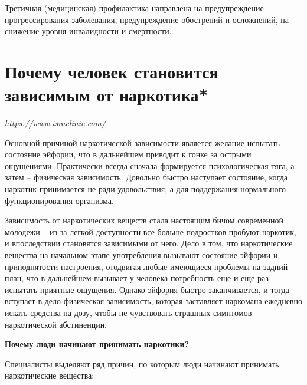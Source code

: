 Третичная (медицинская) профилактика направлена на предупреждение прогрессирования заболевания, предупреждение обострений и осложнений, на снижение уровня инвалидности и смертности.

\newpage
\section{Почему человек становится зависимым от наркотика*}

 {\it \url{https://www.israclinic.com/}}

\begin{fancyquotes}
    Основной причиной наркотической зависимости является желание испытать состояние эйфории, что в дальнейшем приводит к гонке за острыми ощущениями. Практически всегда сначала формируется психологическая тяга, а затем – физическая зависимость. Довольно быстро наступает состояние, когда наркотик принимается не ради удовольствия, а для поддержания нормального функционирования организма.
\end{fancyquotes}

Зависимость от наркотических веществ стала настоящим бичом современной молодежи – из-за легкой доступности все больше подростков пробуют наркотик, и впоследствии становятся зависимыми от него. Дело в том, что наркотические вещества на начальном этапе употребления вызывают состояние эйфории и приподнятости настроения, отодвигая любые имеющиеся проблемы на задний план, что в дальнейшем вызывает у человека потребность еще и еще раз испытать приятные ощущения. Однако эйфория быстро заканчивается, и тогда вступает в дело физическая зависимость, которая заставляет наркомана ежедневно искать средства на дозу, чтобы не чувствовать страшных симптомов наркотической абстиненции.

\textbf{Почему люди начинают принимать наркотики?}

Специалисты выделяют ряд причин, по которым люди начинают принимать наркотические вещества:

